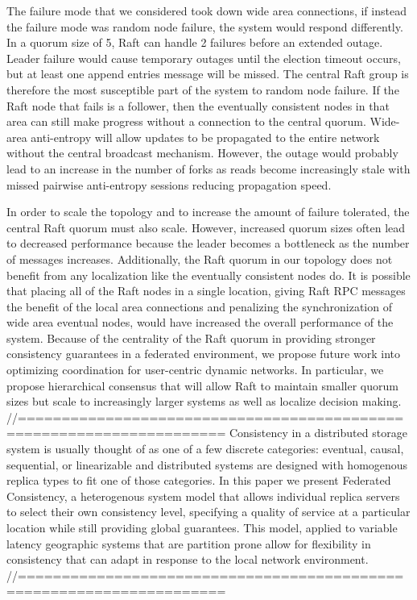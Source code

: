 The failure mode that we considered took down wide area connections, if instead the failure mode was random node failure, the system would respond differently. In a quorum size of 5, Raft can handle 2 failures before an extended outage. Leader failure would cause temporary outages until the election timeout occurs, but at least one append entries message will be missed. The central Raft group is therefore the most susceptible part of the system to random node failure. If the Raft node that fails is a follower, then the eventually consistent nodes in that area can still make progress without a connection to the central quorum. Wide-area anti-entropy will allow updates to be propagated to the entire network without the central broadcast mechanism. However, the outage would probably lead to an increase in the number of forks as reads become increasingly stale with missed pairwise anti-entropy sessions reducing propagation speed.

In order to scale the topology and to increase the amount of failure tolerated, the central Raft quorum must also scale. However, increased quorum sizes often lead to decreased performance because the leader becomes a bottleneck as the number of messages increases. Additionally, the Raft quorum in our topology does not benefit from any localization like the eventually consistent nodes do. It is possible that placing all of the Raft nodes in a single location, giving Raft RPC messages the benefit of the local area connections and penalizing the synchronization of wide area eventual nodes, would have increased the overall performance of the system. Because of the centrality of the Raft quorum in providing stronger consistency guarantees in a federated environment, we propose future work into optimizing coordination for user-centric dynamic networks. In particular, we propose hierarchical consensus that will allow Raft to maintain smaller quorum sizes but scale to increasingly larger systems as well as localize decision making. 
//=====================================================================
Consistency in a distributed storage system is usually thought of as one of a few discrete categories: eventual, causal, sequential, or linearizable and distributed systems are designed with homogenous replica types to fit one of those categories. In this paper we present Federated Consistency, a heterogenous system model that allows individual replica servers to select their own consistency level, specifying a quality of service at a particular location while still providing global guarantees. This model, applied to variable latency geographic systems that are partition prone allow for flexibility in consistency that can adapt in response to the local network environment.
//=====================================================================

